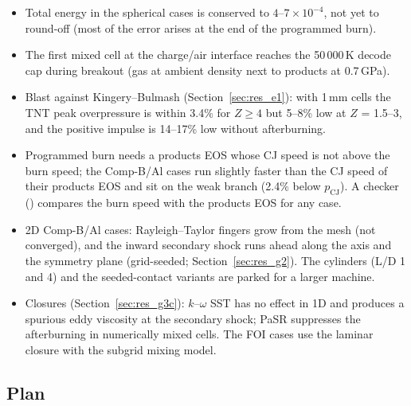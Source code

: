 \documentclass{article}
\begin{document}
\begin{itemize}
    \item Total energy in the spherical cases is conserved to $4$--$7\times10^{-4}$, not yet to round-off (most of the error arises at the end of the programmed burn).
    \item The first mixed cell at the charge/air interface reaches the 50\,000\,K decode cap during breakout (gas at ambient density next to products at 0.7\,GPa).
    \item Blast against Kingery--Bulmash (Section~\ref{sec:res_e1}): with 1\,mm cells the TNT peak overpressure is within 3.4\% for $Z \ge 4$ but 5--8\% low at $Z$ = 1.5--3, and the positive impulse is 14--17\% low without afterburning.
    \item Programmed burn needs a products EOS whose CJ speed is not above the burn speed; the Comp-B/Al cases run slightly faster than the CJ speed of their products EOS and sit on the weak branch (2.4\% below $p_\text{CJ}$). A checker () compares the burn speed with the products EOS for any case.
    \item 2D Comp-B/Al cases: Rayleigh--Taylor fingers grow from the mesh (not converged), and the inward secondary shock runs ahead along the axis and the symmetry plane (grid-seeded; Section~\ref{sec:res_g2}). The cylinders (L/D 1 and 4) and the seeded-contact variants are parked for a larger machine.
    \item Closures (Section~\ref{sec:res_g3c}): $k$--$\omega$ SST has no effect in 1D and produces a spurious eddy viscosity at the secondary shock; PaSR suppresses the afterburning in numerically mixed cells. The FOI cases use the laminar closure with the subgrid mixing model.
\end{itemize}

\subsection{Plan}
\end{document}

